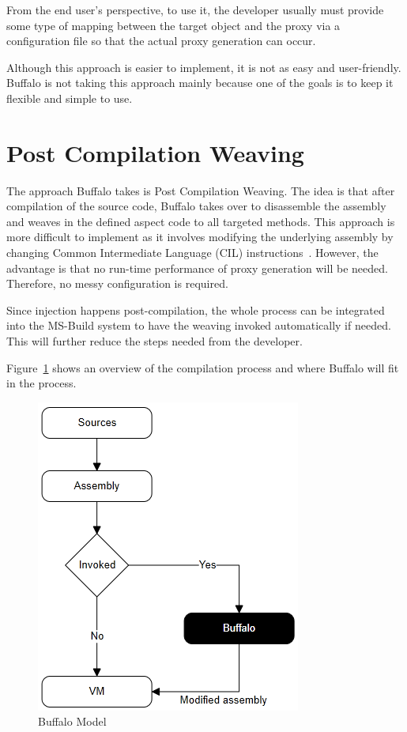 From the end user's perspective, to use it, the developer usually must provide some type of mapping between the target object and the proxy via a configuration file so that the actual proxy generation can occur. 

Although this approach is easier to implement, it is not as easy and user-friendly. Buffalo is not taking this approach mainly because one of the goals is to keep it flexible and simple to use.

\section{Post Compilation Weaving}

The approach Buffalo takes is Post Compilation Weaving. The idea is that after compilation of the source code, Buffalo takes over to disassemble the assembly and weaves in the defined aspect code to all targeted methods. This approach is more difficult to implement as it involves modifying the underlying assembly by changing Common Intermediate Language (CIL) instructions~\cite{rewrite_msil}. However, the advantage is that no run-time performance of proxy generation will be needed. Therefore, no messy configuration is required.

Since injection happens post-compilation, the whole process can be integrated into the MS-Build system to have the weaving invoked automatically if needed. This will further reduce the steps needed from the developer.

Figure~\ref{buffalo_model} shows an overview of the compilation process and where Buffalo will fit in the process.

\begin{figure}[H]
  \includegraphics[scale=1.0]{BuffaloOverview2.PNG}
  \centering
  \caption{Buffalo Model\label{buffalo_model}}
\end{figure}



